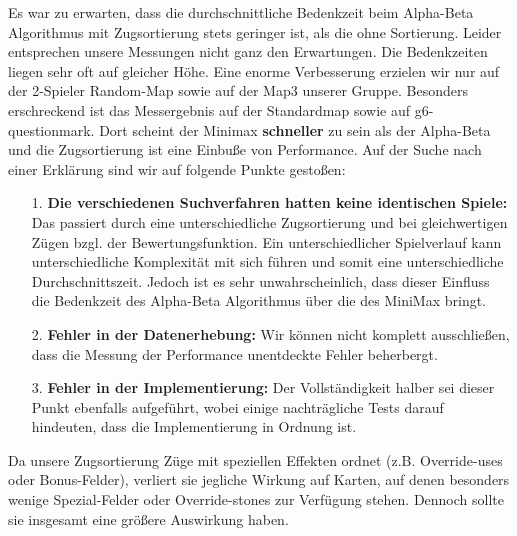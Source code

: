 Es war zu erwarten, dass die durchschnittliche Bedenkzeit beim Alpha-Beta Algorithmus mit Zugsortierung stets geringer ist, als die ohne Sortierung. Leider entsprechen unsere Messungen nicht ganz den Erwartungen. Die Bedenkzeiten liegen sehr oft auf gleicher Höhe. Eine enorme Verbesserung erzielen wir nur auf der 2-Spieler Random-Map sowie auf der Map3 unserer Gruppe. Besonders erschreckend ist das Messergebnis auf der Standardmap sowie auf g6-questionmark. Dort scheint der Minimax \textbf{schneller} zu sein als der Alpha-Beta und die Zugsortierung ist eine Einbuße von Performance. Auf der Suche nach einer Erklärung sind wir auf folgende Punkte gestoßen:
\begin{enumerate}
\item[1.] \textbf{Die verschiedenen Suchverfahren hatten keine identischen Spiele:} Das passiert durch eine unterschiedliche Zugsortierung und bei gleichwertigen Zügen bzgl. der Bewertungsfunktion. Ein unterschiedlicher Spielverlauf kann unterschiedliche Komplexität mit sich führen und somit eine unterschiedliche Durchschnittszeit. Jedoch ist es sehr unwahrscheinlich, dass dieser Einfluss die Bedenkzeit des Alpha-Beta Algorithmus über die des MiniMax bringt.
\item[2.] \textbf{Fehler in der Datenerhebung:} Wir können nicht komplett ausschließen, dass die Messung der Performance unentdeckte Fehler beherbergt.
\item[3.] \textbf{Fehler in der Implementierung:} Der Vollständigkeit halber sei dieser Punkt ebenfalls aufgeführt, wobei einige nachträgliche Tests darauf hindeuten, dass die Implementierung in Ordnung ist.
\end{enumerate}
Da unsere Zugsortierung Züge mit speziellen Effekten ordnet (z.B. Override-uses oder Bonus-Felder), verliert sie jegliche Wirkung auf Karten, auf denen besonders wenige Spezial-Felder oder Override-stones zur Verfügung stehen. Dennoch sollte sie insgesamt eine größere Auswirkung haben.


